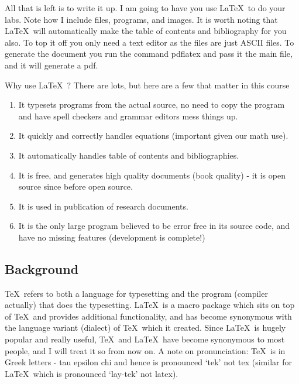 All that is left is to write it up.  I am going to have you use \LaTeX\ to do your labs. Note how I include files, programs, and images.  It is worth noting that \LaTeX\ will automatically make the table of contents and bibliography for you also.  To top it off you only need a text editor as the files are just ASCII files.  To generate the document you run the command pdflatex and pass it the main file, and it will generate a pdf.

Why use \LaTeX\ ?  There are lots, but here are a few that matter in this course
\begin{enumerate}
\item It typesets programs from the actual source, no need to copy the program and have spell checkers and grammar editors mess things up.
\item It quickly and correctly handles equations (important given our math use).
\item It automatically handles table of contents and bibliographies.
\item It is free, and generates high quality documents (book quality) - it is open source since before open source.
\item It is used in publication of research documents.
\item It is the only large program believed to be error free in its source code, and have no missing features (development is complete!)
\end{enumerate}


\subsection{Background}

\TeX\ refers to both a language for typesetting and the program (compiler actually) that does the typesetting.  \LaTeX\ is a macro package which sits on top of \TeX\ and provides additional functionality, and has become synonymous with the language variant (dialect) of \TeX\ which it created.  Since \LaTeX\ is hugely popular and really useful, \TeX\ and \LaTeX\ have become synonymous to most people, and I will treat it so from now on.  A note on pronunciation: \TeX\ is in Greek letters - tau epsilon chi and hence is pronounced `tek' not tex (similar for \LaTeX\, which is pronounced `lay-tek' not latex).


